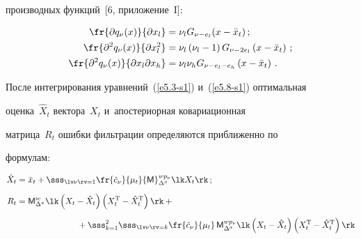 производных функций~[6, приложение~I]:

\begin{align*}

\fr{\partial q_\nu (x)}{\partial x_l} &=\nu_l G_{\nu-e_l}

 (x-\bar x_t)\,;

\\

 \fr{\partial^2 q_\nu (x)}{\partial x_l^2} &=\nu_l\left(\nu_l-1\right) G_{\nu-2e_l}

 \left(x-\bar x_t\right)\,;

\\

 \fr{\partial^2 q_\nu (x)}{\partial x_l \partial x_h}& =\nu_l\nu_h G_{\nu-e_l-e_h}

 \left(x-\bar x_t\right)\,.

 \end{align*}





После интегрирования уравнений~(\ref{e5.3-s1}) и~(\ref{e5.8-s1}) оптимальная

оценка~$\hat X_t$ вектора~$X_t$ и~апостериорная ковариационная

матрица~$R_t$ ошибки фильтрации определяются приближенно по

формулам:

    \begin{align}

    \hat X_t &\displaystyle=\bar x_t + \sss_{\lv\nu\rv=1} \fr{\tilde c_\nu}

    {\mu_t} {\sf M}_{\Delta^x}^{wp_\nu}\lk X_t\rk\,;

        \label{e5.13-s1}\\[6pt]

R_t&= {\sf M}_{\Delta^x}^{w} \lk \left(X_t-\hat X_t\right) \left(X_t^{\mathrm{T}}-\hat X_t^{\mathrm{T}}\right)\rk+{}\notag\\[6pt]

&\displaystyle\hspace*{25mm}{}+\sss_{k=1}^2 \sss_{\lv\nu\rv=k} \fr{\tilde c_\nu}{\mu_t} \,

 {\sf M}_{\Delta^x}^{wp_\nu}\lk

    \left(X_t-\hat X_t\right) \left(X_t^{\mathrm{T}}- \hat X_t^{\mathrm{T}}\right) \rk

\label{e5.14-s1}

       \end{align}

